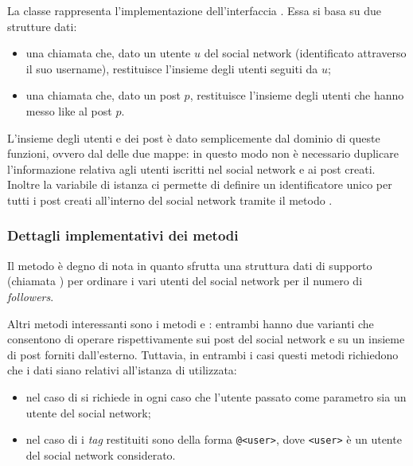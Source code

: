 La classe  rappresenta l'implementazione dell'interfaccia . 
Essa si basa su due strutture dati: 
\begin{itemize}
    \item una  chiamata  che, dato un utente $u$ del social network (identificato attraverso il suo username), restituisce l'insieme degli utenti seguiti da $u$;
    \item una  chiamata  che, dato un post $p$, restituisce l'insieme degli utenti che hanno messo like al post $p$.
\end{itemize}
L'insieme degli utenti e dei post è dato semplicemente dal dominio di queste funzioni, ovvero dal  delle due mappe: in questo modo non è necessario duplicare l'informazione relativa agli utenti iscritti nel social network e ai post creati. Inoltre la variabile di istanza  ci permette di definire un identificatore unico per tutti i post creati all'interno del social network tramite il metodo .

\subsubsection*{Dettagli implementativi dei metodi}

Il metodo  è degno di nota in quanto sfrutta una struttura dati di supporto (chiamata ) per ordinare i vari utenti del social network per il numero di \emph{followers}. 

Altri metodi interessanti sono i metodi  e : entrambi hanno due varianti che consentono di operare rispettivamente sui post del social network e su un insieme di post forniti dall'esterno. Tuttavia, in entrambi i casi questi metodi richiedono che i dati siano relativi all'istanza di  utilizzata:
\begin{itemize}
    \item nel caso di  si richiede in ogni caso che l'utente passato come parametro sia un utente del social network;
    \item nel caso di  i \emph{tag} restituiti sono della forma \texttt{@<user>}, dove \texttt{<user>} è un utente del social network considerato.
\end{itemize}

